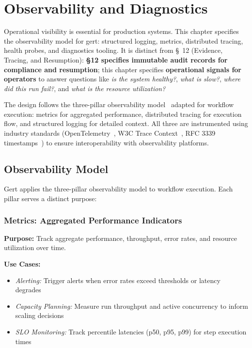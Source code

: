 \chapter{Observability and Diagnostics}

Operational visibility is essential for production systems. This chapter specifies the observability model for gert: structured logging, metrics, distributed tracing, health probes, and diagnostics tooling. It is distinct from \S~12 (Evidence, Tracing, and Resumption): \textbf{§12 specifies immutable audit records for compliance and resumption}; this chapter specifies \textbf{operational signals for operators} to answer questions like \textit{is the system healthy?}, \textit{what is slow?}, \textit{where did this run fail?}, and \textit{what is the resource utilization?}

The design follows the three-pillar observability model~\cite{google-sre-book} adapted for workflow execution: metrics for aggregated performance, distributed tracing for execution flow, and structured logging for detailed context. All three are instrumented using industry standards (OpenTelemetry~\cite{otel-spec}, W3C Trace Context~\cite{w3c-trace-context}, RFC 3339 timestamps~\cite{rfc3339}) to ensure interoperability with observability platforms.

\section{Observability Model}

Gert applies the three-pillar observability model to workflow execution. Each pillar serves a distinct purpose:

\subsection{Metrics: Aggregated Performance Indicators}

\textbf{Purpose:} Track aggregate performance, throughput, error rates, and resource utilization over time.

\textbf{Use Cases:}
\begin{itemize}
  \item \textit{Alerting:} Trigger alerts when error rates exceed thresholds or latency degrades
  \item \textit{Capacity Planning:} Measure run throughput and active concurrency to inform scaling decisions
  \item \textit{SLO Monitoring:} Track percentile latencies (p50, p95, p99) for step execution times
\end{itemize}

